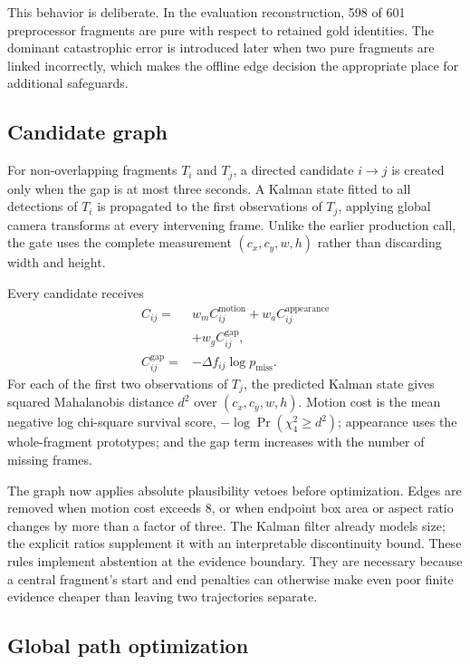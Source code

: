 This behavior is deliberate.  In the evaluation reconstruction, 598 of 601
preprocessor fragments are pure with respect to retained gold identities.  The
dominant catastrophic error is introduced later when two pure fragments are linked
incorrectly, which makes the offline edge decision the appropriate place for
additional safeguards.

\subsection{Candidate graph}

For non-overlapping fragments $T_i$ and $T_j$, a directed candidate $i\rightarrow j$
is created only when the gap is at most three seconds.  A Kalman state fitted to all
detections of $T_i$ is propagated to the first observations of $T_j$, applying global
camera transforms at every intervening frame.  Unlike the earlier production call,
the gate uses the complete measurement $(c_x,c_y,w,h)$ rather than discarding width
and height.

Every candidate receives
\begin{equation}
 \begin{aligned}
 C_{ij}={}&w_m C^{\mathrm{motion}}_{ij}
       +w_a C^{\mathrm{appearance}}_{ij}\\
       &+w_g C^{\mathrm{gap}}_{ij},\\
 C^{\mathrm{gap}}_{ij}={}&-\Delta f_{ij}\log p_{\mathrm{miss}}.
 \end{aligned}
 \label{eq:edge-cost}
\end{equation}
For each of the first two observations of $T_j$, the predicted Kalman state gives
squared Mahalanobis distance $d^2$ over $(c_x,c_y,w,h)$.  Motion cost is the mean
negative log chi-square survival score, $-\log\Pr(\chi^2_4\geq d^2)$; appearance uses
the whole-fragment prototypes; and the gap term increases with the number of missing
frames.

The graph now applies absolute plausibility vetoes before optimization.  Edges are
removed when motion cost exceeds 8, or when endpoint box area or aspect ratio changes
by more than a factor of three.  The Kalman filter already models size; the explicit
ratios supplement it with an interpretable discontinuity bound.  These rules implement
abstention at the evidence boundary.  They are necessary because a central fragment's
start and end penalties can otherwise make even poor finite evidence cheaper than
leaving two trajectories separate.

\subsection{Global path optimization}

